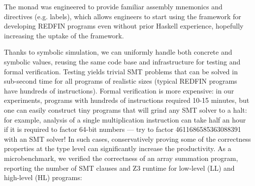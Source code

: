 
The  monad was engineered to provide familiar assembly mnemonics and
directives (e.g. labels), which allows engineers to start
using the framework for developing REDFIN programs even without prior Haskell
experience, hopefully increasing the uptake of the framework.

Thanks to symbolic simulation, we can uniformly handle both concrete and
symbolic values, reusing the same code base and infrastructure for testing and
formal verification.
Testing yields trivial SMT problems that can be solved in sub-second time for
all programs of realistic sizes (typical REDFIN programs have hundreds of
instructions). Formal verification is more expensive: in our experiments,
programs with hundreds of instructions required 10-15 minutes, but one can
easily construct tiny programs that will grind any SMT solver to a halt:
for example, analysis of a single multiplication instruction can take half an
hour if it is required to factor 64-bit numbers --- try to factor
4611686585363088391 with an SMT solver! In such cases, conservatively proving
some of the correctness properties at the type level can significantly increase
the productivity. As a microbenchmark, we verified the correctness of an array
summation program, reporting the number of SMT clauses and Z3 runtime for
low-level (LL) and high-level (HL) programs:

